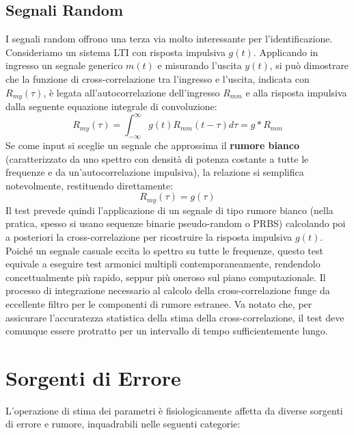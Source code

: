 \subsection{Segnali Random}
I segnali random offrono una terza via molto interessante per l'identificazione. Consideriamo un sistema LTI con risposta impulsiva $g(t)$. Applicando in ingresso un segnale generico $m(t)$ e misurando l'uscita $y(t)$, si può dimostrare che la funzione di cross-correlazione tra l'ingresso e l'uscita, indicata con $R_{my}(\tau)$, è legata all'autocorrelazione dell'ingresso $R_{mm}$ e alla risposta impulsiva dalla seguente equazione integrale di convoluzione:
\[
R_{my}(\tau) = \int_{-\infty}^{\infty} g(t) R_{mm}(t-\tau) d\tau = g*R_{mm}
\]
Se come input si sceglie un segnale che approssima il \textbf{rumore bianco} (caratterizzato da uno spettro con densità di potenza costante a tutte le frequenze e da un'autocorrelazione impulsiva), la relazione si semplifica notevolmente, restituendo direttamente:
\[
R_{my}(\tau) = g(\tau)
\]
Il test prevede quindi l'applicazione di un segnale di tipo rumore bianco (nella pratica, spesso si usano sequenze binarie pseudo-random o PRBS) calcolando poi a posteriori la cross-correlazione per ricostruire la risposta impulsiva $g(t)$. 
Poiché un segnale casuale eccita lo spettro su tutte le frequenze, questo test equivale a eseguire test armonici multipli contemporaneamente, rendendolo concettualmente più rapido, seppur più oneroso sul piano computazionale. Il processo di integrazione necessario al calcolo della cross-correlazione funge da eccellente filtro per le componenti di rumore estranee. Va notato che, per assicurare l'accuratezza statistica della stima della cross-correlazione, il test deve comunque essere protratto per un intervallo di tempo sufficientemente lungo.

\section{Sorgenti di Errore}
L'operazione di stima dei parametri è fisiologicamente affetta da diverse sorgenti di errore e rumore, inquadrabili nelle seguenti categorie:

